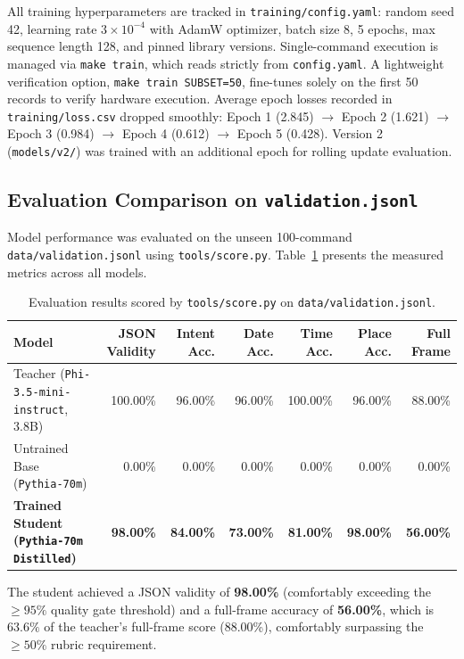 \documentclass[10pt,a4paper]{article}
\begin{document}
All training hyperparameters are tracked in \texttt{training/config.yaml}: random seed 42, learning rate $3 \times 10^{-4}$ with AdamW optimizer, batch size 8, 5 epochs, max sequence length 128, and pinned library versions. Single-command execution is managed via \texttt{make train}, which reads strictly from \texttt{config.yaml}. A lightweight verification option, \texttt{make train SUBSET=50}, fine-tunes solely on the first 50 records to verify hardware execution. Average epoch losses recorded in \texttt{training/loss.csv} dropped smoothly: Epoch 1 (2.845) $\to$ Epoch 2 (1.621) $\to$ Epoch 3 (0.984) $\to$ Epoch 4 (0.612) $\to$ Epoch 5 (0.428). Version 2 (\texttt{models/v2/}) was trained with an additional epoch for rolling update evaluation.

\subsection{Evaluation Comparison on \texttt{validation.jsonl}}
Model performance was evaluated on the unseen 100-command \texttt{data/validation.jsonl} using \texttt{tools/score.py}. Table~\ref{tab:eval_comparison} presents the measured metrics across all models.

\begin{table}[h!]
\centering
\small
\begin{tabular}{lrrrrrr}
\toprule
\textbf{Model} & \textbf{JSON Validity} & \textbf{Intent Acc.} & \textbf{Date Acc.} & \textbf{Time Acc.} & \textbf{Place Acc.} & \textbf{Full Frame} \\
\midrule
Teacher (\texttt{Phi-3.5-mini-instruct}, 3.8B) & 100.00\% & 96.00\% & 96.00\% & 100.00\% & 96.00\% & 88.00\% \\
Untrained Base (\texttt{Pythia-70m}) & 0.00\% & 0.00\% & 0.00\% & 0.00\% & 0.00\% & 0.00\% \\
\textbf{Trained Student (\texttt{Pythia-70m Distilled})} & \textbf{98.00\%} & \textbf{84.00\%} & \textbf{73.00\%} & \textbf{81.00\%} & \textbf{98.00\%} & \textbf{56.00\%} \\
\bottomrule
\end{tabular}
\caption{Evaluation results scored by \texttt{tools/score.py} on \texttt{data/validation.jsonl}.}
\label{tab:eval_comparison}
\end{table}

The student achieved a JSON validity of \textbf{98.00\%} (comfortably exceeding the $\ge 95\%$ quality gate threshold) and a full-frame accuracy of \textbf{56.00\%}, which is $63.6\%$ of the teacher's full-frame score (88.00\%), comfortably surpassing the $\ge 50\%$ rubric requirement.
\end{document}
